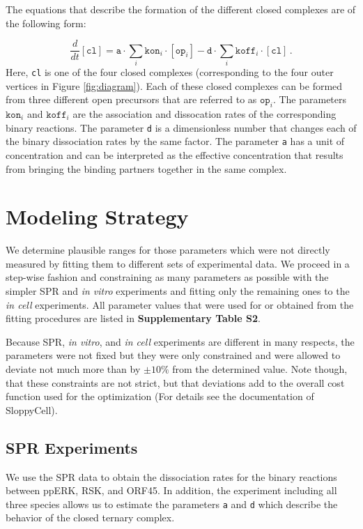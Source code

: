 \documentclass[12pt]{article}
\begin{document}
	The equations that describe the formation of the different closed
	complexes are of the following form:
	
	\begin{equation}
		\frac{d}{dt}[\texttt{cl}]=\texttt{a}\cdot\sum_{i}{\texttt{kon}_{i}}\cdot[\texttt{op}_{i}]-\texttt{d}\cdot\sum_{i}{\texttt{koff}_{i}}\cdot[\texttt{cl}]\,.
	\end{equation}
	Here, \texttt{cl} is one of the four closed complexes (corresponding
	to the four outer vertices in Figure \ref{fig:diagram}). Each of
	these closed complexes can be formed from three different open precursors that are referred to as $\texttt{op}_{i}$. The parameters $\texttt{kon}_{i}$
	and $\texttt{koff}_{i}$ are the association and dissocation rates of the corresponding binary reactions. The parameter \texttt{d} is a dimensionless number that changes each of the binary dissociation
	rates by the same factor. The parameter \texttt{a} has a unit of concentration
	and can be interpreted as the effective concentration that results
	from bringing the binding partners together in the same complex.
	
	\section{Modeling Strategy}
	We determine plausible ranges for those parameters which were not
	directly measured by fitting them to different sets of experimental
	data. We proceed in a step-wise fashion and constraining as many parameters
	as possible with the simpler SPR and \textit{in vitro} experiments
	and fitting only the remaining ones to the \textit{in cell} experiments.
	All parameter values that were used for or obtained from the fitting
	procedures are listed in \textbf{Supplementary Table S2}.
	
	Because SPR, \textit{in vitro}, and \textit{in cell} experiments are
	different in many respects, the parameters were not fixed but they
	were only constrained and were allowed to deviate not much more than
	by $\pm 10\%$ from the determined value. Note though, that these
	constraints are not strict, but that deviations add to the overall
	cost function used for the optimization (For details see the documentation
	of SloppyCell).
	
	\subsection{SPR Experiments}
	We use the SPR data to obtain the dissociation rates for the binary
	reactions between ppERK, RSK, and ORF45. In addition, the experiment
	including all three species allows us to estimate the parameters \texttt{a}
	and \texttt{d} which describe the behavior of the closed ternary complex.
	
\end{document}
